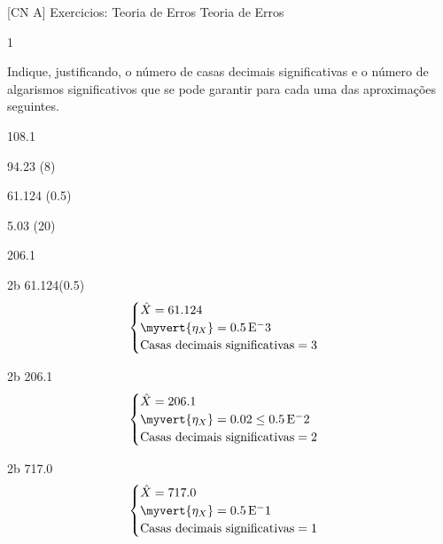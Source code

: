 \documentclass["CN_A-Exercises_Resolutions.tex"]{subfiles}
\begin{document}


[CN A]
{Exercicios: Teoria de Erros} %
{Teoria de Erros} %

\begin{questionBox}1{} %

  Indique, justificando, o número de casas decimais significativas e o número de algarismos significativos que se pode garantir para cada uma das aproximações seguintes.
  \begin{enumerate}[label=\alph{enumi})]
    \begin{multicols}{3}
      \item 108.1
      \item 94.23 (8)
      \item 61.124 (0.5)
      \item 5.03 (20)
      \item 206.1
    \end{multicols}
  \end{enumerate}

  \answer{}

  \setcounter{subquestion}{2}
  \begin{questionBox}2b{ 61.124(0.5) } %
    \begin{gather*}
      \begin{cases}
        \hat{X}=61.124
        \\
        \myvert{\eta_X}=0.5\E-3
        \\
        \text{Casas decimais significativas}
        = 3
      \end{cases}
      \end{gather*}
  \end{questionBox}

  \setcounter{subquestion}{4}
  \begin{questionBox}2b{ 206.1 } %
    \begin{gather*}
      \begin{cases}
        \hat{X}=206.1
        \\
        \myvert{\eta_X}=0.02\leq 0.5\E-2
        \\
        \text{Casas decimais significativas}
        =2
      \end{cases}
      \end{gather*}
  \end{questionBox}

  \begin{questionBox}2b{ 717.0 } %
    \begin{gather*}
      \begin{cases}
        \hat{X}=717.0
        \\
        \myvert{\eta_X}=0.5\E-1
        \\
        \text{Casas decimais significativas}
        =1
      \end{cases}
      \end{gather*}
  \end{questionBox}

\end{questionBox}
\end{document}
